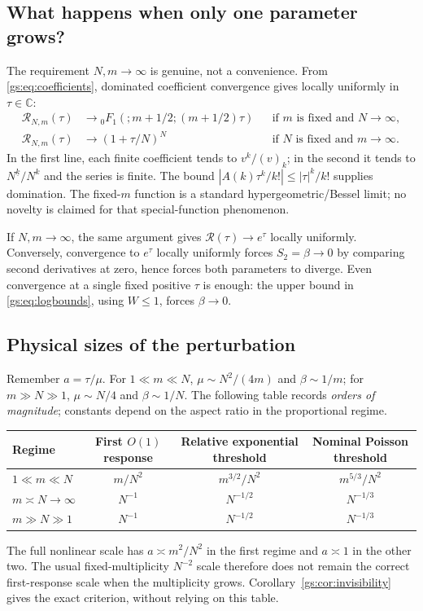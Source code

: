 \documentclass[11pt,a4paper]{article}
\numberwithin{equation}{section}
\theoremstyle{definition}
\theoremstyle{remark}
\newcommand{\CC}{\mathbb C}
\newcommand{\Rgs}{\mathcal R}
\begin{document}
\subsection{What happens when only one parameter grows?}\label{gs:sec:onlyone}
The requirement $N,m\to\infty$ is genuine, not a convenience.
From \eqref{gs:eq:coefficients}, dominated coefficient convergence gives
locally uniformly in $\tau\in\CC$:
\begin{align}\label{gs:eq:fixed-m}
 \Rgs_{N,m}(\tau)&\longrightarrow
 {}_0F_1(;m+1/2;(m+1/2)\tau)
 &&\text{if $m$ is fixed and $N\to\infty$},\\
 \Rgs_{N,m}(\tau)&\longrightarrow(1+\tau/N)^N
 &&\text{if $N$ is fixed and $m\to\infty$}.\label{gs:eq:fixed-N}
\end{align}
In the first line, each finite coefficient tends to $v^k/(v)_k$;
in the second it tends to $N^{\underline k}/N^k$ and the series is finite.
The bound $|A(k)\tau^k/k!|\le|\tau|^k/k!$ supplies domination.
The fixed-$m$ function is a standard hypergeometric/Bessel limit; no novelty
is claimed for that special-function phenomenon.

If $N,m\to\infty$, the same argument gives $\Rgs(\tau)\to e^\tau$
locally uniformly. Conversely, convergence to $e^\tau$ locally uniformly
forces $S_2=\beta\to0$ by comparing second derivatives at zero, hence
forces both parameters to diverge. Even convergence at a single fixed
positive $\tau$ is enough: the upper bound in \eqref{gs:eq:logbounds}, using
$W\le1$, forces $\beta\to0$.

\subsection{Physical sizes of the perturbation}\label{gs:sec:physical}
Remember $a=\tau/\mu$. For $1\ll m\ll N$,
$\mu\sim N^2/(4m)$ and $\beta\sim1/m$; for $m\gg N\gg1$,
$\mu\sim N/4$ and $\beta\sim1/N$.
The following table records \emph{orders of magnitude}; constants depend
on the aspect ratio in the proportional regime.
\begin{center}
\renewcommand{\arraystretch}{1.3}
\begin{tabular}{@{}lccc@{}}
\toprule
Regime & First $O(1)$ response & Relative exponential threshold
 & Nominal Poisson threshold\\
\midrule
$1\ll m\ll N$ & $m/N^2$ & $m^{3/2}/N^2$ & $m^{5/3}/N^2$\\
$m\asymp N\to\infty$ & $N^{-1}$ & $N^{-1/2}$ & $N^{-1/3}$\\
$m\gg N\gg1$ & $N^{-1}$ & $N^{-1/2}$ & $N^{-1/3}$\\
\bottomrule
\end{tabular}
\end{center}
The full nonlinear scale has $a\asymp m^2/N^2$ in the first regime and
$a\asymp1$ in the other two. The usual fixed-multiplicity $N^{-2}$ scale
therefore does not remain the correct first-response scale when the
multiplicity grows. Corollary~\ref{gs:cor:invisibility} gives the exact
criterion, without relying on this table.
\end{document}
